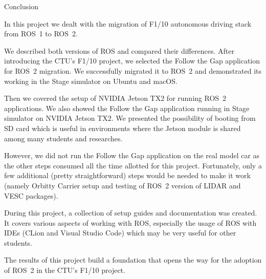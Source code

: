 \chap[conclusion] Conclusion

In this project we dealt with the migration of F1/10 autonomous driving stack from ROS~1 to ROS~2.

We described both versions of ROS and compared their differences. After introducing the CTU's F1/10 project,
we selected the Follow the Gap application for ROS~2 migration. We successfully migrated it to ROS~2
and demonstrated its working in the Stage simulator on Ubuntu and macOS.

Then we covered the setup of NVIDIA Jetson TX2 for running ROS~2 applications.
We also showed the Follow the Gap application running in Stage simulator on NVIDIA Jetson TX2.
We presented the possibility of booting from SD card which is useful in environments where the Jetson module
is shared among many students and researches.

However, we did not run the Follow the Gap application on the real model car as the other steps consumed all the time
allotted for this project. Fortunately, only a few additional (pretty straightforward) steps would be needed
to make it work (namely Orbitty Carrier setup and testing of ROS~2 version of LIDAR and VESC packages).

During this project, a collection of setup guides and documentation was created. It covers various aspects
of working with ROS, especially the usage of ROS with IDEs (CLion and Visual Studio Code) which may be very useful
for other students.

The results of this project build a foundation that opens the way for the adoption of ROS~2 in the CTU's F1/10 project.



